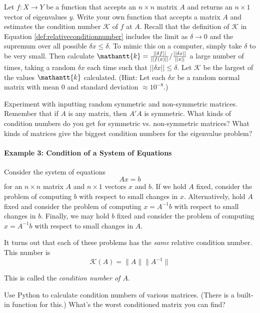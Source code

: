 \begin{problem}
Let $f:X\rightarrow Y$ be a function that accepts an $n\times n$ matrix $A$ and returns an $n \times 1$ vector of eigenvalues $y$. Write your own function that accepts a matrix $A$ and estimates the condition number $\mathcal{K}$ of $f$ at $A$. Recall that the definition of $\mathcal{K}$ in Equation \ref{def:relativeconditionnumber} includes the limit as $\delta \rightarrow 0$ and the supremum over all possible $\delta x \leq \delta$. To mimic this on a computer, simply take $\delta$ to be very small. Then calculate $\mathantt{k} =  { \frac{|| \delta f||}{||f(x)||} } / { \frac{|| \delta x||}{||x||} } $ a large number of times, taking a random $\delta x$ each time such that $||\delta x|| \leq \delta$. Let $\mathcal{K}$ be the largest of the values $\mathantt{k}$ calculated. (Hint: Let each $\delta x$ be a random normal matrix with mean $0$ and standard deviation $\approx 10^{-8}$.)

Experiment with inputting random symmetric and non-symmetric matrices. Remember that if $A$ is any matrix, then $A'A$ is symmetric. What kinds of condition numbers do you get for symmetric vs. non-symmetric matrices? What kinds of matrices give the biggest condition numbers for the eigenvalue problem?
\end{problem}

\paragraph{Example 3: Condition of a System of Equations}
Consider the system of equations
\[ Ax = b
\] for an $n \times n$ matrix $A$ and $n \times 1$ vectors $x$ and $b$. If we hold $A$ fixed, consider the problem of computing $b$ with respect to small changes in $x$. Alternatively, hold $A$ fixed and consider the problem of computing $x = A^{-1} b$ with respect to small changes in $b$. Finally, we may hold $b$ fixed and consider the problem of computing $x = A^{-1}b$ with respect to small changes in $A$.

It turns out that each of these problems has the \emph{same} relative condition number. This number is 
\[
\mathcal{K} (A) = \|A\| \|A^{-1}\|
\]

This is called the \emph{condition number of $A$}.

\begin{problem}
Use Python to calculate condition numbers of various matrices. (There is a built-in function for this.) What's the worst conditioned matrix you can find?
\end{problem}

